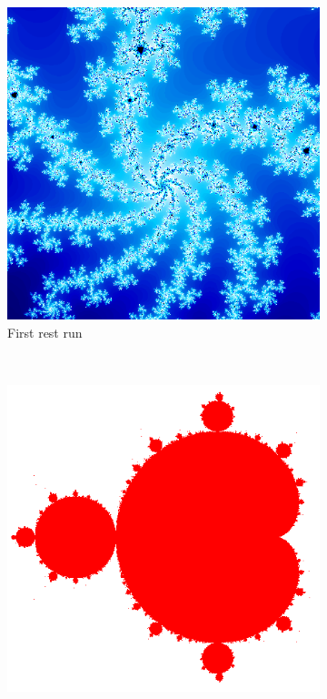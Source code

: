 \begin{figure}
        \centering
        \begin{subfigure}[b]{0.3\textwidth}
                \includegraphics[width=\textwidth]{filecolor}
                \caption*{First rest run}
        \end{subfigure}%
        ~
        \begin{subfigure}[b]{0.3\textwidth}
                \includegraphics[width=\textwidth]{nocolor}

\end{subfigure}
\end{figure}
